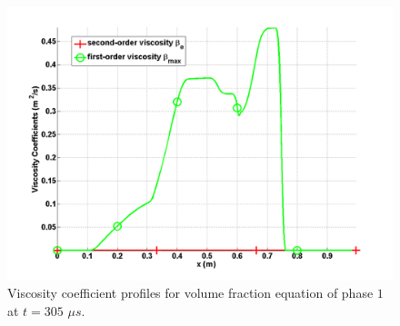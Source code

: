\begin{figure}[H]
\centering
\includegraphics[width=\textwidth]{figures/two_phases_liquid_beta.png}
\caption{Viscosity coefficient profiles for volume fraction equation of phase $1$ at $t=305$ $\mu s$.}
\label{fig:two-indep-fluids-vf-visc-1-7-eqn-sect4}
\end{figure}
%
